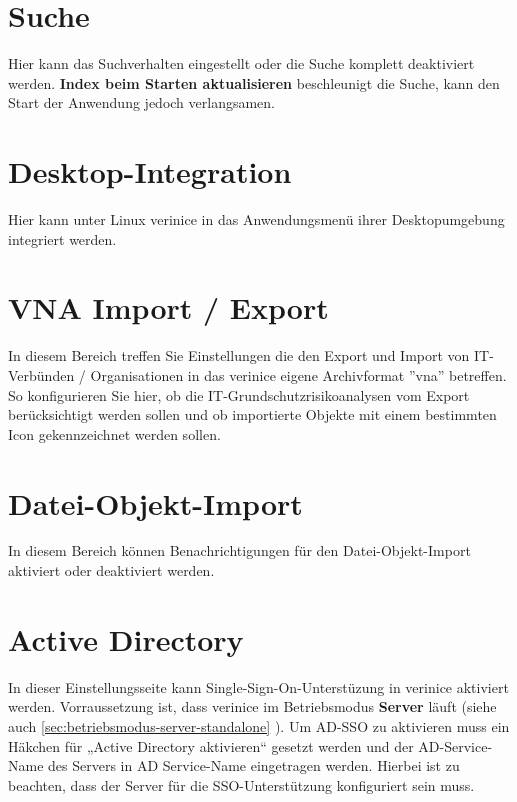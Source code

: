 \documentclass[a4paper,10pt]{book}
\begin{document}
\section{Suche}\label{sec:search}
Hier kann das Suchverhalten eingestellt oder die Suche komplett deaktiviert
werden. \textbf{Index beim Starten aktualisieren} beschleunigt die Suche, kann
den Start der Anwendung jedoch verlangsamen.

\section{Desktop-Integration}\label{sec:desktop-integration}
Hier kann unter Linux verinice in das Anwendungsmenü ihrer Desktopumgebung integriert werden.

\section{VNA Import / Export}
In diesem Bereich treffen Sie Einstellungen die den Export und Import von IT-Verbünden / Organisationen in das verinice eigene Archivformat ''vna''
betreffen. So konfigurieren Sie hier, ob die IT-Grundschutzrisikoanalysen vom Export berücksichtigt werden sollen und ob importierte Objekte mit einem bestimmten Icon
gekennzeichnet werden sollen.

\section{Datei-Objekt-Import}\label{sec:file-object-import}
In diesem Bereich können Benachrichtigungen für den Datei-Objekt-Import
aktiviert oder deaktiviert werden.

\section{Active Directory}
\label{active-directory}

In dieser Einstellungsseite kann Single-Sign-On-Unterstüzung in
verinice aktiviert werden. Vorraussetzung ist, dass verinice im
Betriebsmodus \textbf{Server} läuft (siehe auch
\ref{sec:betriebsmodus-server-standalone} \glqq
{}\grqq). Um AD-SSO zu
aktivieren muss ein Häkchen für „Active Directory aktivieren“
gesetzt werden und der AD-Service-Name des Servers in AD
Service-Name eingetragen werden.  Hierbei ist zu beachten, dass der
Server für die SSO-Unterstützung konfiguriert sein muss.
\end{document}
